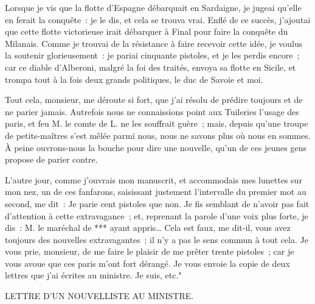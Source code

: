 \documentclass[french,twoside]{book} %
\begin{document}
Lorsque je vis que la flotte d’Espagne débarquait en Sardaigne, je jugeai qu’elle en ferait la conquête : je le dis, et cela se trouva vrai. Enflé de ce succès, j’ajoutai que cette flotte victorieuse irait débarquer à Final pour faire la conquête du Milanais. Comme je trouvai de la résistance à faire recevoir cette idée, je voulus la soutenir glorieusement : je pariai cinquante pistoles, et je les perdis encore ; car ce diable d’Alberoni, malgré la foi des traités, envoya sa flotte en Sicile, et trompa tout à la fois deux grands politiques, le duc de Savoie et moi.\par
Tout cela, monsieur, me déroute si fort, que j’ai résolu de prédire toujours et de ne parier jamais. Autrefois nous ne connaissions point aux Tuileries l’usage des paris, et feu M. le comte de L. ne les souffrait guère ; mais, depuis qu’une troupe de petits-maîtres s’est mêlée parmi nous, nous ne savons plus où nous en sommes. À peine ouvrons-nous la bouche pour dire une nouvelle, qu’un de ces jeunes gens propose de parier contre.\par
L’autre jour, comme j’ouvrais mon manuscrit, et accommodais mes lunettes sur mon nez, un de ces fanfarons, saisissant justement l’intervalle du premier mot au second, me dit : Je parie cent pistoles que non. Je fis semblant de n’avoir pas fait d’attention à cette extravagance ; et, reprenant la parole d’une voix plus forte, je dis : M. le maréchal de *** ayant appris… Cela est faux, me dit-il, vous avez toujours des nouvelles extravagantes ; il n’y a pas le sens commun à tout cela. Je vous prie, monsieur, de me faire le plaisir de me prêter trente pistoles ; car je vous avoue que ces paris m’ont fort dérangé. Je vous envoie la copie de deux lettres que j’ai écrites au ministre. Je suis, etc."\par

\begin{center}
\noindent \centerline{LETTRE D’UN NOUVELLISTE AU MINISTRE.}\par
\end{center}
\end{document}
